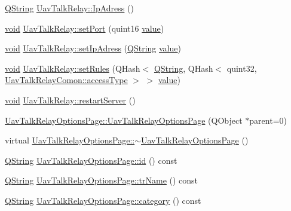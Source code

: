 \begin{DoxyCompactItemize}
\hyperlink{group___u_a_v_objects_plugin_gab9d252f49c333c94a72f97ce3105a32d}{Q\-String} \hyperlink{group___u_a_v_talk_ga8f99b1f0add7784e3aad75a0784728bb}{Uav\-Talk\-Relay\-::\-Ip\-Adress} ()
\item 
\hyperlink{group___u_a_v_objects_plugin_ga444cf2ff3f0ecbe028adce838d373f5c}{void} \hyperlink{group___u_a_v_talk_ga5ef623c050c9d1a65536f7de2eeda738}{Uav\-Talk\-Relay\-::set\-Port} (quint16 \hyperlink{glext_8h_aa0e2e9cea7f208d28acda0480144beb0}{value})
\item 
\hyperlink{group___u_a_v_objects_plugin_ga444cf2ff3f0ecbe028adce838d373f5c}{void} \hyperlink{group___u_a_v_talk_gaae8733ac23163492f5ea685cc69950ca}{Uav\-Talk\-Relay\-::set\-Ip\-Adress} (\hyperlink{group___u_a_v_objects_plugin_gab9d252f49c333c94a72f97ce3105a32d}{Q\-String} \hyperlink{glext_8h_aa0e2e9cea7f208d28acda0480144beb0}{value})
\item 
\hyperlink{group___u_a_v_objects_plugin_ga444cf2ff3f0ecbe028adce838d373f5c}{void} \hyperlink{group___u_a_v_talk_ga61c935860a7d4f77e40c58c10557eed4}{Uav\-Talk\-Relay\-::set\-Rules} (Q\-Hash$<$ \hyperlink{group___u_a_v_objects_plugin_gab9d252f49c333c94a72f97ce3105a32d}{Q\-String}, Q\-Hash$<$ quint32, \hyperlink{group___u_a_v_talk_plugin_gae73e1677650d617d825cf2224fa0626a}{Uav\-Talk\-Relay\-Comon\-::access\-Type} $>$ $>$ \hyperlink{glext_8h_aa0e2e9cea7f208d28acda0480144beb0}{value})
\item 
\hyperlink{group___u_a_v_objects_plugin_ga444cf2ff3f0ecbe028adce838d373f5c}{void} \hyperlink{group___u_a_v_talk_gac7de28de1557a197ee88c192917bca40}{Uav\-Talk\-Relay\-::restart\-Server} ()
\item 
\hyperlink{group___u_a_v_talk_gac97773c8e2650a9c89d3b44262b3c9a5}{Uav\-Talk\-Relay\-Options\-Page\-::\-Uav\-Talk\-Relay\-Options\-Page} (Q\-Object $\ast$parent=0)
\item 
virtual \hyperlink{group___u_a_v_talk_gab4a5b0b63eba0e6df8f5d81ab10f5fff}{Uav\-Talk\-Relay\-Options\-Page\-::$\sim$\-Uav\-Talk\-Relay\-Options\-Page} ()
\item 
\hyperlink{group___u_a_v_objects_plugin_gab9d252f49c333c94a72f97ce3105a32d}{Q\-String} \hyperlink{group___u_a_v_talk_ga1a7f2a6d7fe0eab1466ad5fef1d77448}{Uav\-Talk\-Relay\-Options\-Page\-::id} () const 
\item 
\hyperlink{group___u_a_v_objects_plugin_gab9d252f49c333c94a72f97ce3105a32d}{Q\-String} \hyperlink{group___u_a_v_talk_gaa9de5e7b246a6ed8f405cd79586bcbab}{Uav\-Talk\-Relay\-Options\-Page\-::tr\-Name} () const 
\item 
\hyperlink{group___u_a_v_objects_plugin_gab9d252f49c333c94a72f97ce3105a32d}{Q\-String} \hyperlink{group___u_a_v_talk_ga096c5d44abc589317aae875f985190ed}{Uav\-Talk\-Relay\-Options\-Page\-::category} () const 

\end{DoxyCompactItemize}
